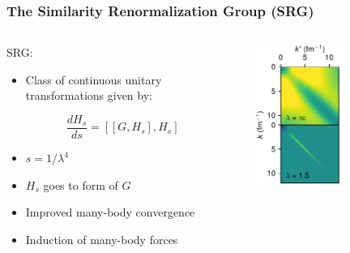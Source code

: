 \documentclass[accentcolor=tud2c,usenames,dvipsnames,colorbacktitle,inverttitle,landscape,german,presentation,t]{tudbeamer}
\begin{document}
  \begin{frame}
    \frametitle{The Similarity Renormalization Group (SRG)}
    \begin{columns}[c]
      \begin{column}{0.5\textwidth}
        SRG:
        \begin{itemize}
          \item Class of continuous unitary transformations given by:
        \end{itemize}
        \begin{equation*}
          \frac{dH_s}{ds} = [[G, H_s], H_s]
        \end{equation*}
        \begin{itemize}
          \item $s=1/\lambda^4$
          \item $H_s$ goes to form of $G$
        \end{itemize}
        \begin{itemize}
          \item<2-> Improved many-body convergence
          \item<2-> Induction of many-body forces
        \end{itemize}
      \end{column}
      \begin{column}{0.5\textwidth}
        \begin{center}
          \begin{overprint}
            \includegraphics[width=0.55\textwidth]{figures/03/srg_potentials}

\end{overprint}
\end{center}
\end{column}
\end{columns}
\end{frame}
\end{document}
